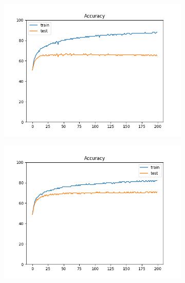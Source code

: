 \documentclass[12pt]{article}
\begin{document}
\begin{figure}
  \begin{subfigure}{0.24\textwidth}
    \centering
    \includegraphics[width=\linewidth]{accuracies_4_noaug.png}
  \end{subfigure}
  \begin{subfigure}{0.24\textwidth}
    \centering
    \includegraphics[width=\linewidth]{accuracies_4_aug.png}
  \end{subfigure}


\end{figure}
\end{document}
